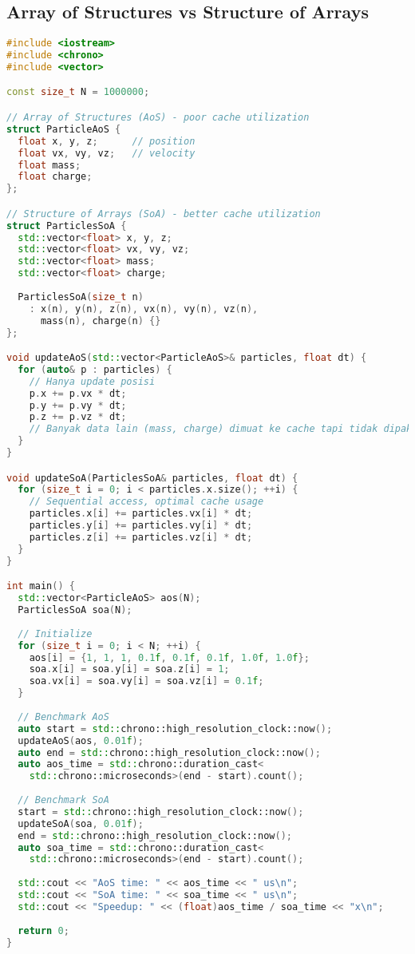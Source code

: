 \documentclass[../main.tex]{subfiles}
\begin{document}
\subsection{Array of Structures vs Structure of Arrays}
\begin{lstlisting}[language=C++, caption={AoS vs SoA comparison}]
#include <iostream>
#include <chrono>
#include <vector>

const size_t N = 1000000;

// Array of Structures (AoS) - poor cache utilization
struct ParticleAoS {
  float x, y, z;      // position
  float vx, vy, vz;   // velocity
  float mass;
  float charge;
};

// Structure of Arrays (SoA) - better cache utilization
struct ParticlesSoA {
  std::vector<float> x, y, z;
  std::vector<float> vx, vy, vz;
  std::vector<float> mass;
  std::vector<float> charge;
  
  ParticlesSoA(size_t n) 
    : x(n), y(n), z(n), vx(n), vy(n), vz(n), 
      mass(n), charge(n) {}
};

void updateAoS(std::vector<ParticleAoS>& particles, float dt) {
  for (auto& p : particles) {
    // Hanya update posisi
    p.x += p.vx * dt;
    p.y += p.vy * dt;
    p.z += p.vz * dt;
    // Banyak data lain (mass, charge) dimuat ke cache tapi tidak dipakai
  }
}

void updateSoA(ParticlesSoA& particles, float dt) {
  for (size_t i = 0; i < particles.x.size(); ++i) {
    // Sequential access, optimal cache usage
    particles.x[i] += particles.vx[i] * dt;
    particles.y[i] += particles.vy[i] * dt;
    particles.z[i] += particles.vz[i] * dt;
  }
}

int main() {
  std::vector<ParticleAoS> aos(N);
  ParticlesSoA soa(N);
  
  // Initialize
  for (size_t i = 0; i < N; ++i) {
    aos[i] = {1, 1, 1, 0.1f, 0.1f, 0.1f, 1.0f, 1.0f};
    soa.x[i] = soa.y[i] = soa.z[i] = 1;
    soa.vx[i] = soa.vy[i] = soa.vz[i] = 0.1f;
  }
  
  // Benchmark AoS
  auto start = std::chrono::high_resolution_clock::now();
  updateAoS(aos, 0.01f);
  auto end = std::chrono::high_resolution_clock::now();
  auto aos_time = std::chrono::duration_cast<
    std::chrono::microseconds>(end - start).count();
  
  // Benchmark SoA
  start = std::chrono::high_resolution_clock::now();
  updateSoA(soa, 0.01f);
  end = std::chrono::high_resolution_clock::now();
  auto soa_time = std::chrono::duration_cast<
    std::chrono::microseconds>(end - start).count();
  
  std::cout << "AoS time: " << aos_time << " us\n";
  std::cout << "SoA time: " << soa_time << " us\n";
  std::cout << "Speedup: " << (float)aos_time / soa_time << "x\n";
  
  return 0;
}
\end{lstlisting}
\end{document}

